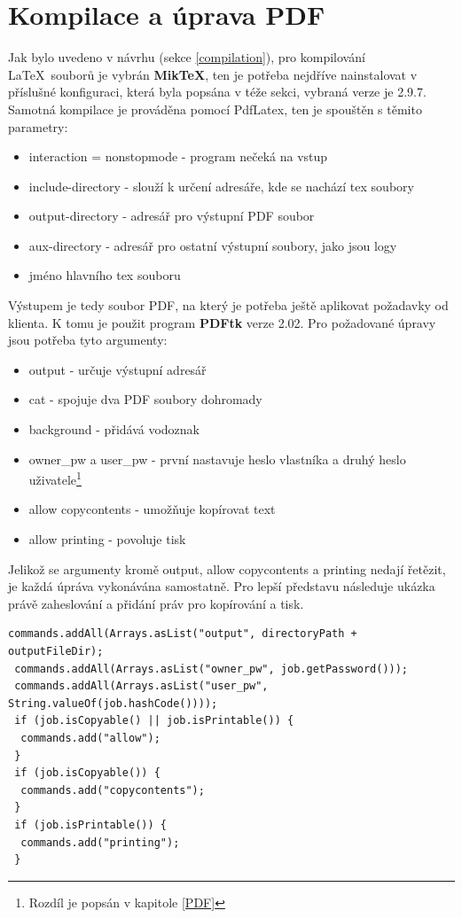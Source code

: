 \section{Kompilace a úprava PDF}
Jak bylo uvedeno v návrhu (sekce \ref{compilation}), pro kompilování \LaTeX\ souborů je vybrán \textbf{MikTeX}, ten je potřeba nejdříve nainstalovat v příslušné konfiguraci, která byla popsána v téže sekci, vybraná verze je 2.9.7. Samotná kompilace je prováděna pomocí PdfLatex, ten je spouštěn s těmito parametry: 
\begin{itemize}
	\item interaction = nonstopmode - program nečeká na vstup
	\item include-directory - slouží k určení adresáře, kde se nachází tex soubory
	\item output-directory - adresář pro výstupní PDF soubor
	\item aux-directory - adresář pro ostatní výstupní soubory, jako jsou logy
	\item jméno hlavního tex souboru
\end{itemize}
Výstupem je tedy soubor PDF, na který je potřeba ještě aplikovat požadavky od klienta.
K tomu je použit program \textbf{PDFtk} verze 2.02. Pro požadované úpravy jsou potřeba tyto argumenty:
\begin{itemize}
	\item output - určuje výstupní adresář
	\item cat - spojuje dva PDF soubory dohromady
	\item background - přidává vodoznak
	\item owner\_pw a user\_pw - první nastavuje heslo vlastníka a druhý heslo uživatele\footnote{Rozdíl je popsán v kapitole \ref{PDF}}
	\item allow copycontents - umožňuje kopírovat text
	\item allow printing - povoluje tisk
\end{itemize}
Jelikož se argumenty kromě output, allow copycontents a printing nedají řetězit, je každá úpráva vykonávána samostatně. Pro lepší představu následuje ukázka právě zaheslování a přidání práv pro kopírování a tisk.

\begin{lstlisting}[caption=Zaheslování a úprava práv souboru PDF]
 commands.addAll(Arrays.asList("output", directoryPath + outputFileDir);
 commands.addAll(Arrays.asList("owner_pw", job.getPassword()));
 commands.addAll(Arrays.asList("user_pw", String.valueOf(job.hashCode())));
 if (job.isCopyable() || job.isPrintable()) {
  commands.add("allow");
 }
 if (job.isCopyable()) {
  commands.add("copycontents");
 }
 if (job.isPrintable()) {
  commands.add("printing");
 }
\end{lstlisting}

